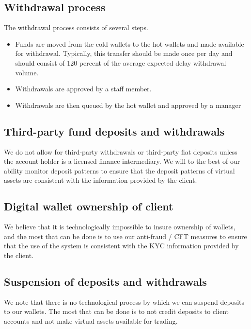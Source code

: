 \subsection{Withdrawal process}
The withdrawal process consists of several steps.
\begin{itemize}
  \item Funds are moved from the cold wallets to the hot wallets and
    made available for withdrawal.  Typically, this transfer should be
    made once per day and should consist of 120 percent of the average
    expected delay withdrawal volume.
  \item Withdrawals are approved by a staff member.
  \item Withdrawals are then queued by the hot wallet and approved by a manager
\end{itemize}

\subsection{Third-party fund deposits and withdrawals}
We do not allow for third-party withdrawals or third-party fiat
deposits unless the account holder is a licensed finance intermediary.
We will to the best of our ability monitor deposit patterns to ensure
that the deposit patterns of virtual assets are consistent with the
information provided by the client.

\subsection{Digital wallet ownership of client}
We believe that it is technologically impossible to insure ownership
of wallets, and the most that can be done is to use our anti-fraud /
CFT measures to ensure that the use of the system is consistent with
the KYC information provided by the client.

\subsection{Suspension of deposits and withdrawals}
We note that there is no technological process by which we can suspend
deposits to our wallets.  The most that can be done is to not
credit deposits to client accounts and not make virtual assets
available for trading.

